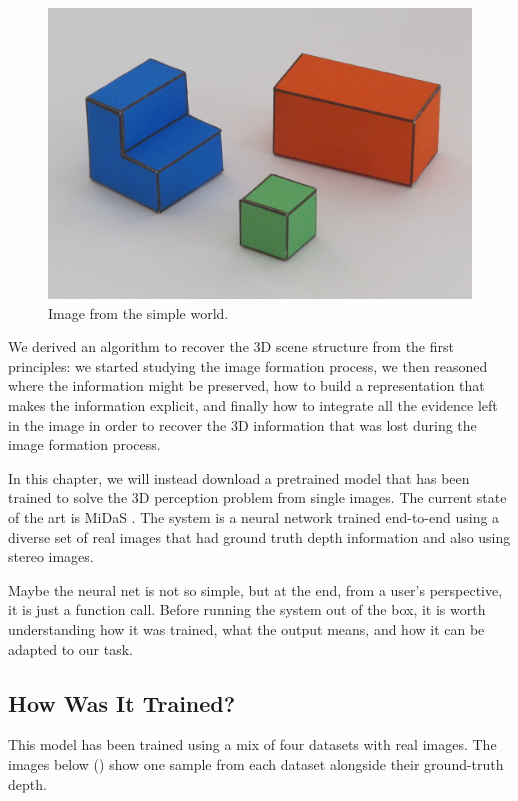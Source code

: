 \begin{figure}
    \centerline{
        \includegraphics[width=0.4\linewidth]{figures/simplesystem_revisited/img1.jpg}
    }
    \caption{Image from the simple world.}
    \label{fig:simplesystem_revisited_img1}
\end{figure}

We derived an algorithm to recover the 3D scene structure from the first principles: we started studying the image formation process, we then reasoned where the information might be preserved, how to build a representation that makes the information explicit, and finally how to integrate all the evidence left in the image in order to recover the 3D information that was lost during the image formation process.

In this chapter, we will instead download a pretrained model that has been trained to solve the 3D perception problem from single images. The current state of the art is MiDaS \cite{Ranftl2021,Ranftl2022}. The system is a neural network trained end-to-end using a diverse set of real images that had ground truth depth information and also using stereo images.

Maybe the neural net is not so simple, but at the end, from a user's perspective, it is just a function call. Before running the system out of the box, it is worth understanding how it was trained, what the output means,  and how it can be adapted to our task.

\subsection{How Was It Trained?}

This model has been trained using a mix of four datasets with real images. The images below (\fig{\ref{fig:examples_training_midas}}) show one sample from each dataset alongside their ground-truth depth.

